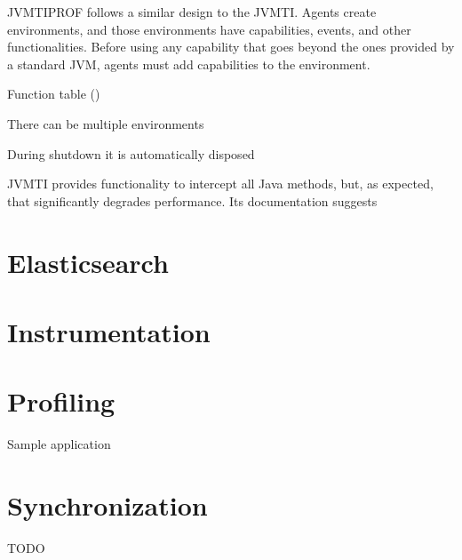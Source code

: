 JVMTIPROF follows a similar design to the JVMTI. Agents create environments, and those environments have capabilities, events, and other functionalities. Before using any capability that goes beyond the ones provided by a standard JVM, agents must add capabilities to the environment. %

Function table ()

There can be multiple environments

During shutdown it is automatically disposed

JVMTI provides functionality to intercept all Java methods, but, as expected, that significantly degrades performance. Its documentation suggests






\section{Elasticsearch}

\section{Instrumentation}



\section{Profiling}




Sample application



\section{Synchronization}


TODO


